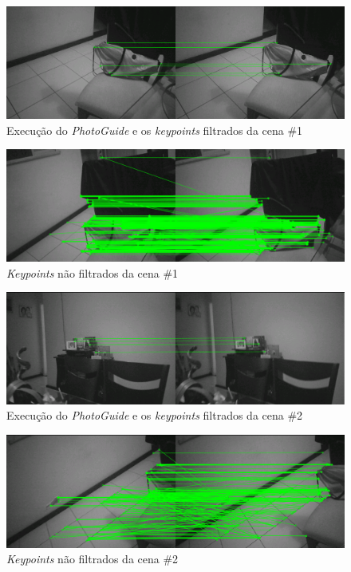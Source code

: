 \begin{figure}[H]
	\centering
		\includegraphics[width= \textwidth]{Imagens/figura3-8.png}
	\caption{Execução do \textit{PhotoGuide} e os \textit{keypoints} filtrados da cena \#1}
	\label{fig3:8}
\end{figure}

\begin{figure}[H]
	\centering
		\includegraphics[width= \textwidth]{Imagens/figura3-10.png}
	\caption{\textit{Keypoints} não filtrados da cena \#1}
	\label{fig3:9}
\end{figure}

\begin{figure}[H]
	\centering
		\includegraphics[width= \textwidth]{Imagens/figura3-9.png}
	\caption{Execução do \textit{PhotoGuide} e os \textit{keypoints} filtrados da cena \#2}
	\label{fig3:10}
\end{figure}

\begin{figure}[H]
	\centering
		\includegraphics[width= \textwidth]{Imagens/figura3-11.png}
	\caption{\textit{Keypoints} não filtrados da cena \#2}
	\label{fig3:11}
\end{figure}


